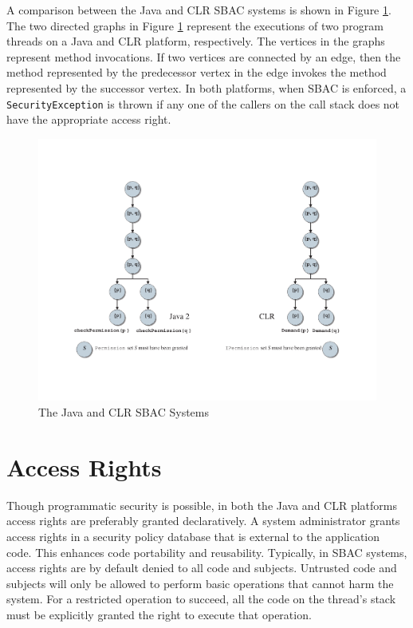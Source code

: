 A comparison
between the Java and CLR SBAC systems is shown in Figure
\ref{fig:JVMandCLR}.  The two directed graphs in Figure
\ref{fig:JVMandCLR} represent the executions of two program
threads on a Java and CLR platform, respectively. The vertices
in the graphs represent method invocations.  If two vertices are
connected by an edge, then the method represented by
the predecessor vertex in the edge invokes the method represented
by the successor vertex.  In both platforms, when SBAC is
enforced, a \texttt{SecurityException} is thrown if any one of the
callers on the call stack does not have the appropriate access
right.
\begin{figure}[ht]
	\centering
\includegraphics[scale=0.4]{JVMandCLR-eps-converted-to.pdf}
	\caption{The Java and CLR SBAC Systems}
	\label{fig:JVMandCLR}
\end{figure}

\section{Access Rights} \label{sec:AccessRights}

Though programmatic security is possible, in both the Java and
CLR platforms access rights are preferably granted declaratively.
A system administrator grants access rights in a security policy
database that is external to the application code. This enhances
code portability and reusability.  Typically, in SBAC systems,
access rights are by default denied to all code and subjects.
Untrusted code and subjects will only be allowed to perform basic
operations that cannot harm the system.  For a restricted
operation to succeed, all the code on the thread's stack must be
explicitly granted the right to execute that operation.

